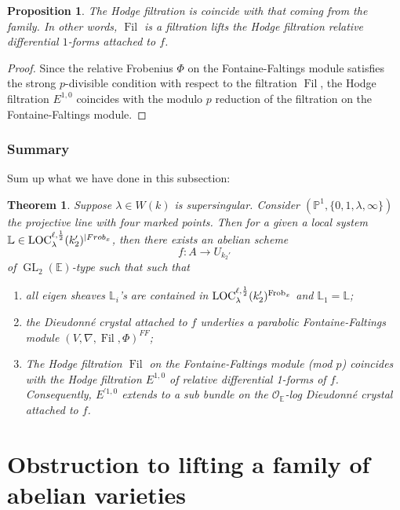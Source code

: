 \documentclass[12pt,twoside]{book}
\theoremstyle{plain}
\newtheorem{theorem}{Theorem}[section]
\newtheorem{proposition}[proposition]{Proposition}
\theoremstyle{definition}
\theoremstyle{remark}
\newcommand{\bL}{{\mathbb L}}
\newcommand{\bP}{{\mathbb P}}
\newcommand{\mO}{{\mathcal O}}
\DeclareMathOperator\Fil{Fil}
\DeclareMathOperator\GL{GL}
\numberwithin{equation}{section}
\def\Loch{{\mathrm{LOC}^{\ell,{1\over 2}}_{\lambda}}}
\def\Frob{\mathrm{Frob}}
\def\EK{{\mathbb E}}
\begin{document}
\begin{proposition}
The Hodge filtration is coincide with that coming from the family. In other words, $\Fil$ is a filtration lifts the Hodge filtration relative differential $1$-forms attached to $f$.
\end{proposition}

\begin{proof}
Since the relative Frobenius $\Phi$ on the Fontaine-Faltings module satisfies the strong $p$-divisible condition with respect to the filtration $\Fil$, the Hodge filtration $E^{1,0}$ coincides with the modulo $p$ reduction of the filtration on the Fontaine-Faltings module.
\end{proof}

\subsubsection{Summary}
Sum up what we have done in this subsection:
\begin{theorem} \label{thm_main_loc_to_family_char_p}
\label{thm_construction_family_mod_p}
Suppose $\lambda\in W(k)$ is supersingular. Consider $(\bP^1,\{0,1,\lambda,\infty\})$ the projective line with four marked points. Then for a given a local system $\bL\in \Loch(k_2')^{|Frob_x}$, then there exists an abelian scheme
\[f: A \to U_{k_2'}\]
of $\GL_2(\EK)$-type such that
such that
\begin{enumerate}[1).]
\item all eigen sheaves $\bL_i$'s are contained in $\Loch(k_2')^{\Frob_x}$ and $\bL_1=\bL$;
\item the Dieudonn\'e crystal attached to $f$ underlies a parabolic Fontaine-Faltings module $(V,\nabla,\Fil,\Phi)^{FF}$;
\item The Hodge filtration $\Fil$ on the Fontaine-Faltings module (mod $p$) coincides with the Hodge filtration $E^{1,0}$ of relative differential 1-forms of $f$. Consequently, $E^{'1,0}$ extends to a
sub bundle on the $\mO_\EK$-log Dieudonn\'e crystal attached to $f$.
\end{enumerate}
\end{theorem}

\newpage

\section{Obstruction to lifting a family of abelian varieties} \label{sec_main_compare_obstructions}
\end{document}
